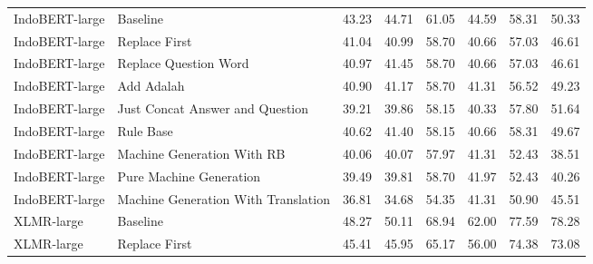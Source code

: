 \begin{table}[H]
\begin{tabular}{llrrrrrr}
\hline
IndoBERT-large &                            Baseline &                   43.23 &                    44.71 &                   61.05 &                    44.59 &                   58.31 &                    50.33 \\
IndoBERT-large &                       Replace First &                   41.04 &                    40.99 &                   58.70 &                    40.66 &                   57.03 &                    46.61 \\
IndoBERT-large &               Replace Question Word &                   40.97 &                    41.45 &                   58.70 &                    40.66 &                   57.03 &                    46.61 \\
IndoBERT-large &                          Add Adalah &                   40.90 &                    41.17 &                   58.70 &                    41.31 &                   56.52 &                    49.23 \\
IndoBERT-large &     Just Concat Answer and Question &                   39.21 &                    39.86 &                   58.15 &                    40.33 &                   57.80 &                    51.64 \\
IndoBERT-large &                           Rule Base &                   40.62 &                    41.40 &                   58.15 &                    40.66 &                   58.31 &                    49.67 \\
IndoBERT-large &          Machine Generation With RB &                   40.06 &                    40.07 &                   57.97 &                    41.31 &                   52.43 &                    38.51 \\
IndoBERT-large &             Pure Machine Generation &                   39.49 &                    39.81 &                   58.70 &                    41.97 &                   52.43 &                    40.26 \\
IndoBERT-large & Machine Generation With Translation &                   36.81 &                    34.68 &                   54.35 &                    41.31 &                   50.90 &                    45.51 \\
\hline
    XLMR-large &                            Baseline &                   48.27 &                    50.11 &                   68.94 &                    62.00 &                   77.59 &                    78.28 \\
    XLMR-large &                       Replace First &                   45.41 &                    45.95 &                   65.17 &                    56.00 &                   74.38 &                    73.08 \\

\end{tabular}
\end{table}
